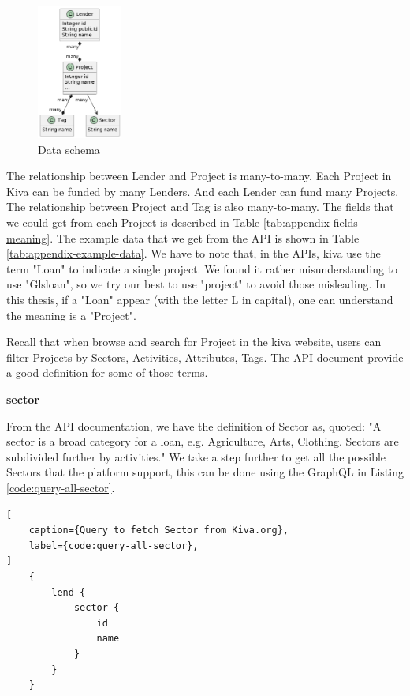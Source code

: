 \begin{figure}[H]
	\centering
	\includegraphics[width=0.25\textwidth]{images/graphuml/dataschema.png}
	\caption{Data schema}
	\label{fig:data-schema}
\end{figure}

The relationship between Lender and Project is many-to-many.
Each Project in Kiva can be funded by many Lenders.
And each Lender can fund many Projects.
The relationship between Project and Tag is also many-to-many.
The fields that we could get from each Project is described in Table \ref{tab:appendix-fields-meaning}.
The example data that we get from the API is shown in Table \ref{tab:appendix-example-data}.
We have to note that, in the APIs, kiva use the term "Loan" to indicate a single project.
We found it rather misunderstanding to use "Gls{loan}", so we try our best to use "\Gls{project}" to avoid those misleading.
In this thesis, if a "Loan" appear (with the letter L in capital), one can understand the meaning is a "Project".

Recall that when browse and search for Project in the kiva website,
users can filter Projects by Sectors, Activities, Attributes, Tags.
The API document provide a good definition for some of those terms.

\textbf{\Gls{sector}}

From the API documentation, we have the definition of Sector as, quoted:
"A sector is a broad category for a loan, e.g. Agriculture, Arts, Clothing. Sectors are subdivided further by activities."
We take a step further to get all the possible Sectors that the platform support,
this can be done using the GraphQL in Listing \ref{code:query-all-sector}.

\begin{minipage}[c]{0.95\textwidth}
	\begin{lstlisting}[
	caption={Query to fetch Sector from Kiva.org},
	label={code:query-all-sector},
]
    {
        lend {
            sector {
                id
                name
            }
        }
    }
\end{lstlisting}
\end{minipage}


